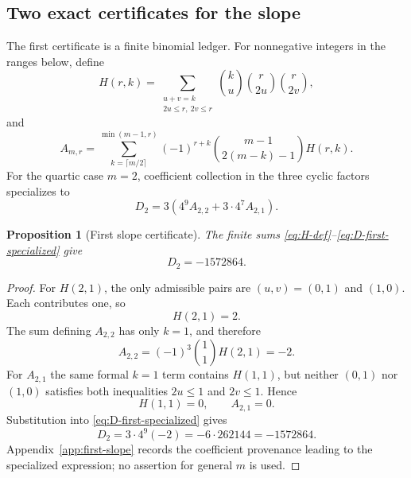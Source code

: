 \documentclass[11pt]{article}
\newtheorem{proposition}[theorem]{Proposition}
\theoremstyle{definition}
\begin{document}
{\subsection{Two exact certificates for the slope}

The first certificate is a finite binomial ledger. For nonnegative integers in the ranges below, define
\begin{equation}
H(r,k)
=
\sum_{\substack{u+v=k\\2u\le r,\ 2v\le r}}
\binom{k}{u}\binom{r}{2u}\binom{r}{2v},
\label{eq:H-def}
\end{equation}
and
\begin{equation}
A_{m,r}
=
\sum_{k=\lceil m/2\rceil}^{\min(m-1,r)}
(-1)^{r+k}
\binom{m-1}{2(m-k)-1}H(r,k).
\label{eq:A-def}
\end{equation}
For the quartic case $m=2$, coefficient collection in the three cyclic factors specializes to
\begin{equation}
D_2
=3\left(
4^9A_{2,2}+3\cdot4^7A_{2,1}
\right).
\label{eq:D-first-specialized}
\end{equation}

\begin{proposition}[First slope certificate]
\label{prop:first-slope}
The finite sums \eqref{eq:H-def}--\eqref{eq:D-first-specialized} give
\[
D_2=-1572864.
\]
\end{proposition}

\begin{proof}
For $H(2,1)$, the only admissible pairs are $(u,v)=(0,1)$ and $(1,0)$. Each contributes one, so
\[
H(2,1)=2.
\]
The sum defining $A_{2,2}$ has only $k=1$, and therefore
\[
A_{2,2}
=(-1)^3\binom11H(2,1)=-2.
\]
For $A_{2,1}$ the same formal $k=1$ term contains $H(1,1)$, but neither $(0,1)$ nor $(1,0)$ satisfies both inequalities $2u\le1$ and $2v\le1$. Hence
\[
H(1,1)=0,
\qquad A_{2,1}=0.
\]
Substitution into \eqref{eq:D-first-specialized} gives
\[
D_2=3\cdot4^9(-2)=-6\cdot262144=-1572864.
\]
Appendix~\ref{app:first-slope} records the coefficient provenance leading to the specialized expression; no assertion for general $m$ is used.
\end{proof}

}
\end{document}
